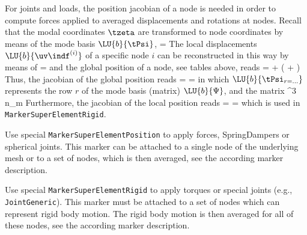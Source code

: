     For joints and loads, the position jacobian of a node is needed in order to compute forces applied to averaged displacements and 
    rotations at nodes.
    Recall that the modal coordinates $\tzeta$ are transformed to node coordinates by means of the mode basis  $\LU{b}{\tPsi}$,
    \be
       =  \tzeta \eqDot
    \ee
    The local displacements $\LU{b}{\uv\indf^{(i)}}$ of a specific node $i$ can be reconstructed in this way by means of
    \be
       =  \eqComma
    \ee
    and the global position of a node, see tables above, reads
    \be
       =  +  \left(  +  \right)
    \ee
    Thus, the jacobian of the global position reads
    \be
      = 
     = \left[\ImThree, \; -\LU{0b}{\Rot} \left(\LU{b}{\tilde\uv\indf^{(i)}} + \LU{b}{\tilde\xv^{(i)}\cRef} \right) \LU{b}{\Gm},\;
             \LU{0b}{\Rot} \vr{\LU{b}{\tPsi_{r=3i}\tp}}{\LU{b}{\tPsi_{r=3i+1}\tp}}{\LU{b}{\tPsi_{r=3i+2}\tp}}\right] \eqComma
    \ee
    in which $\LU{b}{\tPsi_{r=...}}$ represents the row $r$ of the mode basis (matrix) $\LU{b}{\Psi}$, and
    the matrix 
    \be
       \in \Rcal^{3 \times n_m}
    \ee
    Furthermore, the jacobian of the local position reads
    \be
      = 
     = \left[\Null, \; \Null, \; \vr{\LU{b}{\tPsi_{r=3i}\tp}}{\LU{b}{\tPsi_{r=3i+1}\tp}}{\LU{b}{\tPsi_{r=3i+2}\tp}}\right] \eqComma
    \ee
    which is used in \texttt{MarkerSuperElementRigid}.
    
    
    Use special \texttt{MarkerSuperElementPosition} to apply forces, SpringDampers or spherical joints. This marker can be attached to a single node of the underlying
    mesh or to a set of nodes, which is then averaged, see the according marker description.
    
    Use special \texttt{MarkerSuperElementRigid} to apply torques or special joints (e.g., \texttt{JointGeneric}). 
    This marker must be attached to a set of nodes which can represent rigid body motion. The rigid body motion is then averaged for all of these nodes,
    see the according marker description.
    
